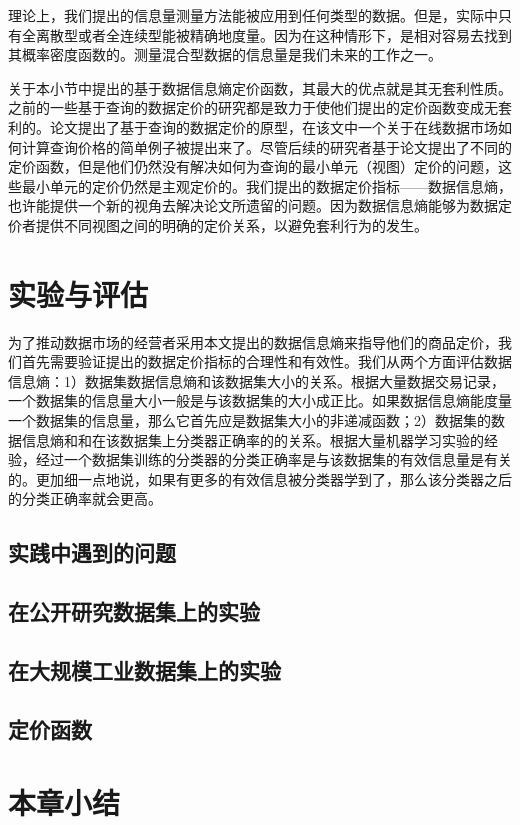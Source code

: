 理论上，我们提出的信息量测量方法能被应用到任何类型的数据。但是，实际中只有全离散型或者全连续型能被精确地度量。因为在这种情形下，是相对容易去找到其概率密度函数的。测量混合型数据的信息量是我们未来的工作之一。

关于本小节中提出的基于数据信息熵定价函数，其最大的优点就是其无套利性质。之前的一些基于查询的数据定价的研究\cite{balazinska2011data,koutris2012querymarket,koutris2015query}都是致力于使他们提出的定价函数变成无套利的。论文\cite{balazinska2011data}提出了基于查询的数据定价的原型，在该文中一个关于在线数据市场如何计算查询价格的简单例子被提出来了。尽管后续的研究者基于论文\cite{balazinska2011data}提出了不同的定价函数，但是他们仍然没有解决如何为查询的最小单元（视图）定价的问题，这些最小单元的定价仍然是主观定价的。我们提出的数据定价指标——数据信息熵，也许能提供一个新的视角去解决论文\cite{balazinska2011data,koutris2012querymarket,koutris2015query}所遗留的问题。因为数据信息熵能够为数据定价者提供不同视图之间的明确的定价关系，以避免套利行为的发生。


\section{实验与评估}

为了推动数据市场的经营者采用本文提出的数据信息熵来指导他们的商品定价，我们首先需要验证提出的数据定价指标的合理性和有效性。我们从两个方面评估数据信息熵：1）数据集数据信息熵和该数据集大小的关系。根据大量数据交易记录，一个数据集的信息量大小一般是与该数据集的大小成正比。如果数据信息熵能度量一个数据集的信息量，那么它首先应是数据集大小的非递减函数；2）数据集的数据信息熵和和在该数据集上分类器正确率的的关系。根据大量机器学习实验的经验，经过一个数据集训练的分类器的分类正确率是与该数据集的有效信息量是有关的。更加细一点地说，如果有更多的有效信息被分类器学到了，那么该分类器之后的分类正确率就会更高。

\subsection{实践中遇到的问题}

\subsection{在公开研究数据集上的实验}

\subsection{在大规模工业数据集上的实验}

\subsection{定价函数}

\section{本章小结}